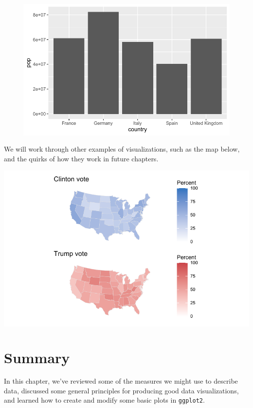 \documentclass[
  letterpaper,
]{book}
\begin{document}
\begin{figure}[H]

{\centering \includegraphics{visualizing-with-ggplot_files/figure-pdf/unnamed-chunk-30-1.pdf}

}

\end{figure}

We will work through other examples of visualizations, such as the map
below, and the quirks of how they work in future chapters.

\includegraphics{visualizing-with-ggplot_files/figure-pdf/unnamed-chunk-31-1.pdf}

\hypertarget{summary-1}{%
\section{Summary}\label{summary-1}}

In this chapter, we've reviewed some of the measures we might use to
describe data, discussed some general principles for producing good data
visualizations, and learned how to create and modify some basic plots in
\texttt{ggplot2}.
\end{document}
